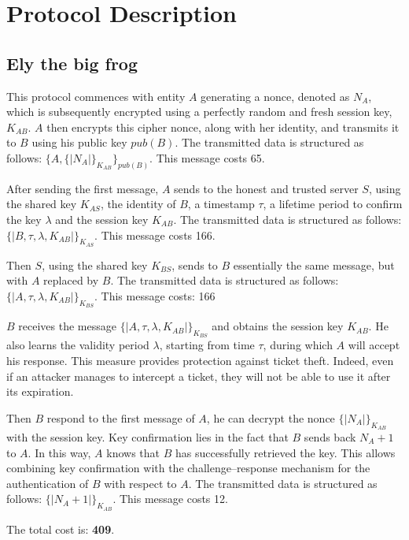 \section{Protocol Description}
\subsection{Ely the big frog}


This protocol commences with entity $A$ generating a nonce, denoted as $N_A$, which is subsequently encrypted using
a perfectly random and fresh session key, $K_{AB}$. $A$ then encrypts this cipher nonce, along with her identity, and
transmits it to $B$ using his public key $pub(B)$. The transmitted data is structured as follows:
$\{A, \{|N_A|\}_{K_{AB}}\}_{pub(B)}$. This message costs 65.

\vspace{1cm}

After sending the first message, $A$ sends to the honest and trusted server $S$, using the shared key $K_{AS}$,
the identity of $B$, a timestamp $\tau$, a lifetime period to confirm the key $\lambda$ and the session key $K_{AB}$.
The transmitted data is structured as follows: $\{|B, \tau, \lambda, K_{AB}|\}_{K_{AS}}$. This message costs 166.

\vspace{1cm}

Then $S$, using the shared key $K_{BS}$, sends to $B$ essentially the same message, but with $A$ replaced by $B$.
The transmitted data is structured as follows: $\{|A, \tau, \lambda, K_{AB}|\}_{K_{BS}}$. This message costs: 166

\vspace{1cm}

$B$ receives the message $\{|A, \tau, \lambda, K_{AB}|\}_{K_{BS}}$ and obtains the session key $K_{AB}$.
He also learns the validity period $\lambda$, starting from time $\tau$, during which $A$ will accept his response.
This measure provides protection against ticket theft. Indeed, even if an attacker manages to intercept a ticket,
they will not be able to use it after its expiration.

Then $B$ respond to the first message of $A$, he can decrypt the nonce $\{|N_A|\}_{K_{AB}}$ with the session key.
Key confirmation lies in the fact that $B$ sends back $N_A + 1$ to $A$. In this way, $A$ knows that $B$ has successfully
retrieved the key. This allows combining key confirmation with the challenge–response mechanism for the authentication
of $B$ with respect to $A$. The transmitted data is structured as follows: $\{| N_A + 1|\}_{K_{AB}}$. This message costs 12.



\vspace{1cm}

The total cost is: \textbf{409}.